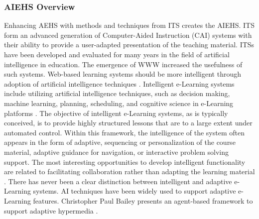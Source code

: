 \documentclass[12pt,a4paper,final,twoside,onecolumn,titlepage]{book}
\begin{document}
\subsubsection{AIEHS Overview}
Enhancing \gls{AEHS} with methods and techniques from \gls{ITS} creates the \gls{AIEHS}. \gls{ITS} form an advanced generation of Computer-Aided Instruction (CAI) systems with their ability to provide a user-adapted presentation of the teaching material. ITSs have been developed and evaluated for many years in the field of artificial intelligence in education. The emergence of WWW increased the usefulness of such systems. Web-based learning systems should be more intelligent through adoption of artificial intelligence techniques \cite{R01}. Intelligent e-Learning systems include utilizing artificial intelligence techniques, such as decision making, machine learning, planning, scheduling, and cognitive science in e-Learning platforms \cite{R23}. The objective of intelligent e-Learning systems, as is typically conceived, is to provide highly structured lessons that are to a large extent under automated control. Within this framework, the intelligence of the system often appears in the form of adaptive, sequencing or personalization of the course material, adaptive guidance for navigation, or interactive problem solving support. The most interesting opportunities to develop intelligent functionality are related to facilitating collaboration rather than adapting the learning material \cite{R24}. There has never been a clear distinction between intelligent and adaptive e-Learning systems. AI techniques have been widely used to support adaptive e-Learning features. Christopher Paul Bailey presents an agent-based framework to support adaptive hypermedia \cite{R25}.
\end{document}

